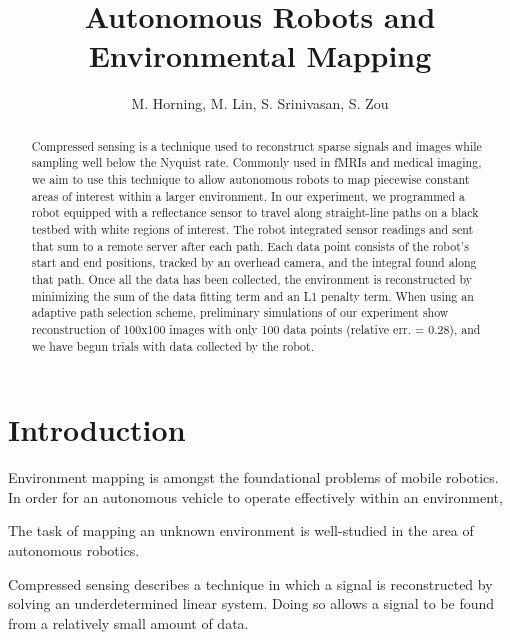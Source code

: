 \documentclass[english]{article}\usepackage[]{graphicx}\usepackage[]{color}
\begin{document}
\title{Autonomous Robots and Environmental Mapping}

\author{M. Horning, M. Lin, S. Srinivasan, S. Zou}

\maketitle

\begin{abstract}

Compressed sensing is a technique used to reconstruct sparse signals and images while sampling well below the Nyquist rate. Commonly used in fMRIs and medical imaging, we aim to use this technique to allow autonomous robots to map piecewise constant areas of interest within a larger environment. In our experiment, we programmed a robot equipped with a reflectance sensor to travel along straight-line paths on a black testbed with white regions of interest. The robot integrated sensor readings and sent that sum to a remote server after each path. Each data point consists of the robot's start and end positions, tracked by an overhead camera, and the integral found along that path. Once all the data has been collected, the environment is reconstructed by minimizing the sum of the data fitting term and an L1 penalty term. When using an adaptive path selection scheme, preliminary simulations of our experiment show reconstruction of 100x100 images with only 100 data points (relative err. = 0.28), and we have begun trials with data collected by the robot.

\end{abstract}

\pagebreak
\tableofcontents
\pagebreak

\section{Introduction}

Environment mapping is amongst the foundational problems of mobile robotics. In order for an autonomous vehicle to operate effectively within an environment, 

The task of mapping an unknown environment is well-studied in the area of autonomous robotics. 

Compressed sensing describes a technique in which a signal is reconstructed by solving an underdetermined linear system. Doing so allows a signal to be found from a relatively small amount of data. 
\end{document}
